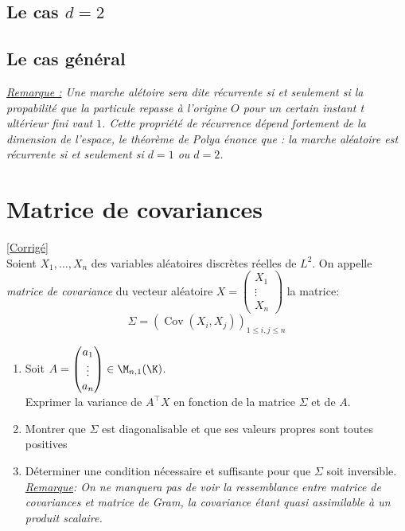 \documentclass[8pt]{book}
\begin{document}
\subsection{Le cas $d=2$}


\subsection{Le cas général}
\textit{\underline{Remarque :} Une marche alétoire sera dite récurrente si et seulement si la propabilité que la particule repasse à l'origine $O$ pour un certain instant t ultérieur fini vaut $1$.
	Cette propriété de récurrence dépend fortement de la dimension de l'espace, le théorème de Polya énonce que : la marche aléatoire est récurrente si et seulement si $d=1$ ou $d=2$.}


\section{Matrice de covariances }
\label{Matrice de covariances}
\textcolor{blue}{\hyperref[Matrice de covariance corrigé]{[Corrigé]}}\\
Soient $X_1,\dots,X_n$ des variables aléatoires discrètes réelles de $L^2$. On appelle \textit{matrice de covariance} du vecteur aléatoire $X=\begin{pmatrix} X_1\\ \vdots\\ X_n \end{pmatrix}$ la matrice: $$\Sigma=(\operatorname{Cov}(X_i,X_j))_{1\leq i,j\leq n}$$
\begin{enumerate}
	\item Soit $A=\begin{pmatrix} a_1\\ \vdots\\ a_n \end{pmatrix}\in \M_{n,1}(\K)$.
	\\Exprimer la variance de $A^\top X$ en fonction de la matrice $\Sigma$ et de $A$.
	\item Montrer que $\Sigma$ est diagonalisable et que ses valeurs propres sont toutes positives
	\item Déterminer une condition nécessaire et suffisante pour que $\Sigma$ soit inversible.
	\\ \textit{\underline{Remarque}: On ne manquera pas de voir la ressemblance entre matrice de covariances et matrice de Gram, la covariance étant quasi assimilable à un produit scalaire.}
\end{enumerate}
\end{document}
